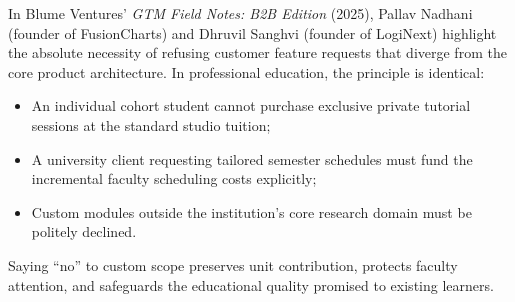 In Blume Ventures' \textit{GTM Field Notes: B2B Edition} (2025), Pallav Nadhani (founder of FusionCharts) and Dhruvil Sanghvi (founder of LogiNext) highlight the absolute necessity of refusing customer feature requests that diverge from the core product architecture. In professional education, the principle is identical:
\begin{itemize}
\item An individual cohort student cannot purchase exclusive private tutorial sessions at the standard studio tuition;
\item A university client requesting tailored semester schedules must fund the incremental faculty scheduling costs explicitly;
\item Custom modules outside the institution's core research domain must be politely declined.
\end{itemize}
Saying ``no'' to custom scope preserves unit contribution, protects faculty attention, and safeguards the educational quality promised to existing learners.
